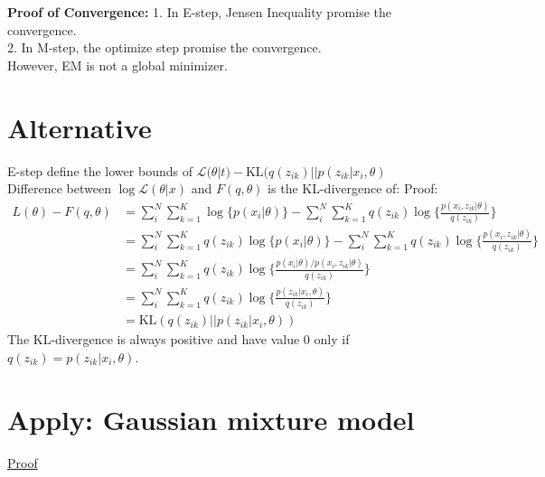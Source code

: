 \documentclass{article}
\begin{document}
\textbf{Proof of Convergence:}
1. In E-step, Jensen Inequality promise the convergence. \\
2. In M-step, the optimize step promise the convergence. \\
However, EM is not a global minimizer.

\section{Alternative}
E-step define the lower bounds of $\mathcal{L}(\theta|t) - \mathrm{KL}(q(z_{ik})||p(z_{ik}|x_i,\theta) $ \\
Difference between $\log\mathcal{L}(\theta|x) $ and $ F(q,\theta)$ is the KL-divergence of:
Proof:
\begin{equation}
	\begin{aligned}
		L(\theta) - F(q,\theta) & = \sum_i^N \sum_{k=1}^K \log\{{ p(x_i|\theta)}\} - \sum_i^N \sum_{k=1}^K q(z_{ik})\log\{\frac{p(x_i,z_{ik}|\theta)}{q(z_{ik})}\}          \\
		                        & = \sum_i^N \sum_{k=1}^K q(z_{ik})\log\{{ p(x_i|\theta)}\} - \sum_i^N \sum_{k=1}^K q(z_{ik})\log\{\frac{p(x_i,z_{ik}|\theta)}{q(z_{ik})}\} \\
		                        & = \sum_i^N \sum_{k=1}^K q(z_{ik})\log\{\frac{p(x_i|\theta)/p(x_i,z_{ik}|\theta)}{q(z_{ik})}\}                                             \\
		                        & = \sum_i^N \sum_{k=1}^K q(z_{ik})\log\{\frac{p(z_{ik}|x_i,\theta)}{q(z_{ik})}\}                                                           \\
		                        & = \mathrm{KL}(q(z_{ik})||p(z_{ik}|x_i,\theta))
	\end{aligned}
\end{equation}
The KL-divergence is always positive and have value 0 only if $q(z_{ik}) = p(z_{ik}|x_i,\theta)$.

\section{Apply: Gaussian mixture model}
\href{https://biarnes-adrien.medium.com/em-of-gmm-appendix-m-step-full-derivations-4ae95cdd40c9}{Proof}
\end{document}
